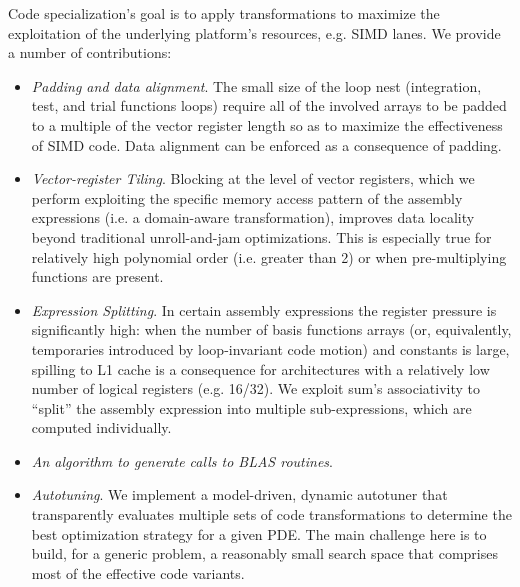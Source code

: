 Code specialization's goal is to apply transformations to maximize the exploitation of the underlying platform's resources, e.g. SIMD lanes. We provide a number of contributions:
\begin{itemize}
\item \emph{Padding and data alignment}. The small size of the loop nest (integration, test, and trial functions loops) require all of the involved arrays to be padded to a multiple of the vector register length so as to maximize the effectiveness of SIMD code. Data alignment can be enforced as a consequence of padding. 
\item \emph{Vector-register Tiling}. Blocking at the level of vector registers, which we perform exploiting the specific memory access pattern of the assembly expressions (i.e. a domain-aware transformation), improves data locality beyond traditional unroll-and-jam optimizations. This is especially true for relatively high polynomial order (i.e. greater than 2) or when pre-multiplying functions are present.
\item \emph{Expression Splitting}. In certain assembly expressions the register pressure is significantly high: when the number of basis functions arrays (or, equivalently, temporaries introduced by loop-invariant code motion) and constants is large, spilling to L1 cache is a consequence for architectures with a relatively low number of logical registers (e.g. 16/32). We exploit sum's associativity to ``split'' the assembly expression into multiple sub-expressions, which are computed individually.
\item \emph{An algorithm to generate calls to BLAS routines}.
\item \emph{Autotuning}. We implement a model-driven, dynamic autotuner that transparently evaluates multiple sets of code transformations to determine the best optimization strategy for a given PDE. The main challenge here is to build, for a generic problem, a reasonably small search space that comprises most of the effective code variants.
\end{itemize} 

